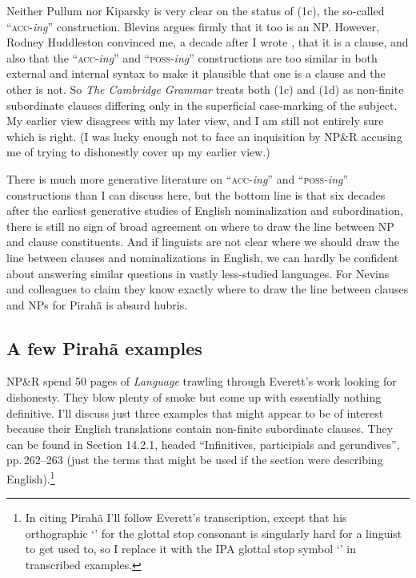 \documentclass[output=paper,colorlinks,citecolor=brown
]{langscibook}
\begin{document}
Neither Pullum nor Kiparsky is very clear on the status of (1c), the
so-called ``\textsc{acc}-\textit{ing}'' construction. Blevins argues
firmly that it too is an NP. However, Rodney Huddleston convinced me,
a decade after I wrote \citet{Pullum91}, that it is a clause, and also
that the ``\textsc{acc}-\textit{ing}'' and ``\textsc{poss}-\textit{ing}''
constructions are too similar in both external and internal syntax
to make it plausible that one is a clause and the other is not.
So \textit{The Cambridge Grammar} treats both (1c) and (1d) as
non-finite subordinate clauses differing only in the superficial
case-marking of the subject. My earlier view disagrees with my later
view, and I am still not entirely sure which is right. (I was
lucky enough not to face an inquisition by NP\&R accusing me of
trying to dishonestly cover up my earlier view.)

There is much more generative literature on ``\textsc{acc}-\textit{ing}''
and ``\textsc{poss}-\textit{ing}'' constructions than I can discuss here,
but the bottom line is that six decades after the earliest generative
studies of English nominalization and subordination, there is still
no sign of broad agreement on where to draw the line between NP and
clause constituents.  And if linguists are not clear where we should
draw the line between clauses and nominalizations in English, we can
hardly be confident about answering similar questions in vastly
less-studied languages. For Nevins and colleagues to claim they know
exactly where to draw the line between clauses and NPs for Pirah{\~a}
is absurd hubris.

\subsection{A few Pirah{\~a} examples}

NP\&R spend 50 pages of \textit{Language} trawling through Everett's
work looking for dishonesty. They blow plenty of smoke but come up
with essentially nothing definitive. I'll discuss just three examples
that might appear to be of interest because their English translations
contain non-finite subordinate clauses. They can be found in
\citet{Everett86HAL} Section 14.2.1, headed ``Infinitives, participials
and gerundives'', pp.\,262--263 (just the terms that might be used if
the section were describing English).\footnote{%
   In citing Pirah{\~a} I'll follow Everett's transcription, except
   that his orthographic `' for the glottal stop consonant is
   singularly hard for a linguist to get used to, so I replace it with the
   IPA glottal stop symbol `{\textglotstop}' in transcribed examples.}
\end{document}
